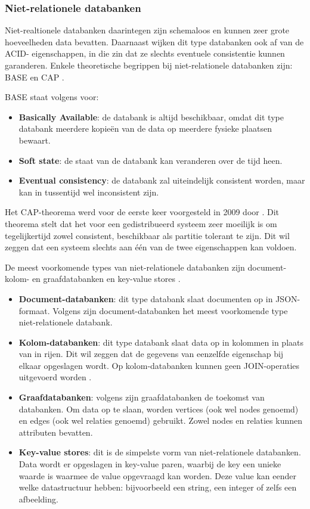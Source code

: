\subsubsection{Niet-relationele databanken}
Niet-realtionele databanken daarintegen zijn schemaloos en kunnen zeer grote hoeveelheden data bevatten. Daarnaast wijken dit type databanken ook af van de ACID- eigenschappen, in die zin dat ze slechts eventuele consistentie kunnen garanderen. Enkele theoretische begrippen bij niet-relationele databanken zijn: BASE en CAP \autocite{Elsabagh2022}.

BASE staat volgens \textcite{Elsabagh2022} voor:

\begin{itemize}
    \item \textbf{Basically Available}: de databank is altijd beschikbaar, omdat dit type databank meerdere kopieën van de data op meerdere fysieke plaatsen bewaart.
    \item \textbf{Soft state}: de staat van de databank kan veranderen over de tijd heen.
    \item \textbf{Eventual consistency}: de databank zal uiteindelijk consistent worden, maar kan in tussentijd wel inconsistent zijn.
\end{itemize}

Het CAP-theorema werd voor de eerste keer voorgesteld in 2009 door \textcite{Simon2012}. Dit theorema stelt dat het voor een gedistribueerd systeem zeer moeilijk is om tegelijkertijd zowel consistent, beschikbaar als partitie tolerant te zijn. Dit wil zeggen dat een systeem slechts aan één van de twee eigenschappen kan voldoen.

De meest voorkomende types van niet-relationele databanken zijn document- kolom- en graafdatabanken en key-value stores \autocite{Elsabagh2022}.

\begin{itemize}
    \item \textbf{Document-databanken}: dit type databank slaat documenten op in JSON-formaat. Volgens \textcite{Sullivan2015} zijn document-databanken het meest voorkomende type niet-relationele databank.
    \item \textbf{Kolom-databanken}: dit type databank slaat data op in kolommen in plaats van in rijen. Dit wil zeggen dat de gegevens van eenzelfde eigenschap bij elkaar opgeslagen wordt. Op kolom-databanken kunnen geen JOIN-operaties uitgevoerd worden \autocite{Sullivan2015}.
    \item \textbf{Graafdatabanken}: volgens \textcite{Elsabagh2022} zijn graafdatabanken de toekomst van databanken. Om data op te slaan, worden vertices (ook wel nodes genoemd) en edges (ook wel relaties genoemd) gebruikt. Zowel nodes en relaties kunnen attributen bevatten.
    \item \textbf{Key-value stores}: dit is de simpelste vorm van niet-relationele databanken. Data wordt er opgeslagen in key-value paren, waarbij de key een unieke waarde is waarmee de value opgevraagd kan worden. Deze value kan eender welke datastructuur hebben: bijvoorbeeld een string, een integer of zelfs een afbeelding.
\end{itemize}

